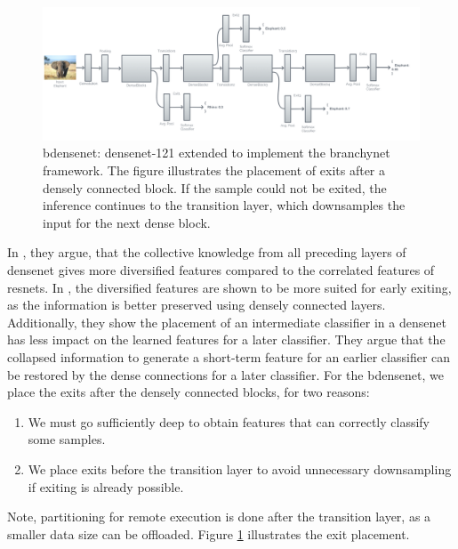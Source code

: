 \begin{figure}
	\centering
	\includegraphics[width=\linewidth]{figures/models/b-densenet}
	\caption[B-\gls{densenet} architecture]{\gls{bdensenet}: \gls{densenet}-121 extended to implement the \gls{branchynet} framework. The figure illustrates the placement of exits after a densely connected block. If the sample could not be exited, the inference continues to the transition layer, which downsamples the input for the next dense block. }
	\label{fig:b-densenet}
\end{figure}

In \cite{huang_multi-scale_2017}, they argue, that the collective knowledge from all preceding layers of \gls{densenet} gives more diversified features compared to the correlated features of \gls{resnet}s. In \cite{huang_multi-scale_2017}, the diversified features are shown to be more suited for early exiting, as the information is better preserved using densely connected layers. Additionally, they show the placement of an intermediate classifier in a \gls{densenet} has less impact on the learned features for a later classifier. They argue that the collapsed information to generate a short-term feature for an earlier classifier can be restored by the dense connections for a later classifier. 
For the \gls{bdensenet}, we place the exits after the densely connected blocks, for two reasons: 

\begin{enumerate}
	\item We must go sufficiently deep to obtain features that can correctly classify some samples.
	\item We place exits before the transition layer to avoid unnecessary downsampling if exiting is already possible. 
\end{enumerate}

Note, partitioning for remote execution is done after the transition layer, as a smaller data size can be offloaded. Figure \ref{fig:b-densenet} illustrates the exit placement.

